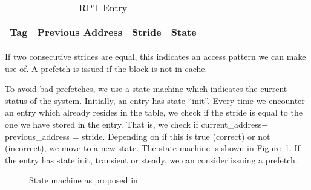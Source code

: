 \begin{table}
  \centering
  \begin{tabular}{ | c | c | c | c |}
    \hline
    Tag & Previous Address & Stride & State \\ \hline
  \end{tabular}
  \caption{RPT Entry}
  \label{table:entry}
\end{table}

If two consecutive strides are equal, this indicates an access pattern
we can make use of. A prefetch is issued if the block is not in cache.

To avoid bad prefetches, we use a state machine which indicates the
current status of the system. Initially, an entry has state
``init''. Every time we encounter an entry which already resides in
the table, we check if the stride is equal to the one we have stored
in the entry. That is, we check if current\_address$ -
$previous\_address = stride. Depending on if this is true (correct) or
not (incorrect), we move to a new state. The state machine is shown in
Figure~\ref{figure:statemachine}. If the entry has state init,
transient or steady, we can consider issuing a prefetch.


\begin{figure}[h]
\begin{center}
\caption{State machine as proposed in~\cite{chen_baer_1995}}
\label{figure:statemachine}
\end{center}
\end{figure}

